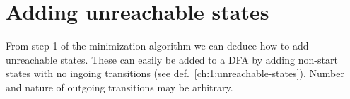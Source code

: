 %		
%
%
%






\section{Adding unreachable states}

From step 1 of the minimization algorithm we can deduce how to add unreachable states. These can easily be added to a DFA by adding non-start states with no ingoing transitions (see def.~\ref{ch:1:unreachable-states}). Number and nature of outgoing transitions may be arbitrary.

